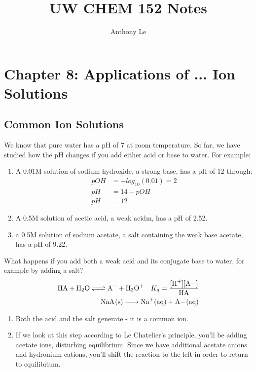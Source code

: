 \documentclass[../CHEM152Notes.tex]{subfiles}
\title{UW CHEM 152 Notes}
\author{Anthony Le}
\begin{document}
\pagestyle{fancy}
\fancyhead{}

\section*{Chapter 8: Applications of ... Ion Solutions}

\subsection*{Common Ion Solutions}
We know that pure water has a pH of 7 at room temperature. 
So far, we have studied how the pH changes if you add either acid or base to water. For example:
\begin{enumerate}
    \item A 0.01M solution of sodium hydroxide, a strong base, has a pH of 12 through:
    \begin{equation*}
        \begin{aligned}
            pOH &= -log_{10}(0.01) = 2 \\
            pH &= 14-pOH \\
            pH &= 12
        \end{aligned}
    \end{equation*}
    \item A 0.5M solution of acetic acid, a weak acidm, has a pH of 2.52.
    \item a 0.5M solution of sodium acetate, a salt containing the weak base acetate, has a pH of 9.22.
\end{enumerate}
What happens if you add both a weak acid and its conjugate base to water, for example by adding a salt?
\begin{equation*}
    \begin{aligned}
        \ce{HA + H2O <=> A- + H3O+} \quad K_a = \ce{\frac{[H+][A-]}{HA}} \\
        \ce{NaA_(s) -> Na+_(aq) + A-_(aq)} 
    \end{aligned}
\end{equation*}
\begin{enumerate}
    \item Both the acid and the salt generate  - it is a common ion.
    \item If we look at this step according to Le Chatelier's principle, you'll be adding acetate ions, disturbing equilibrium. Since we have additional acetate anions and hydronium cations, you'll shift the reaction to the left in order to return to equilibrium.
\end{enumerate}
\end{document}
